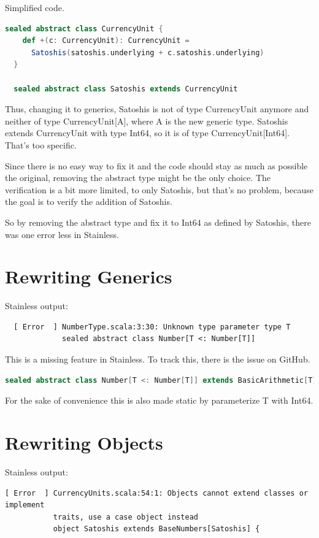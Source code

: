 Simplified code.
\begin{lstlisting}[language=scala]
  sealed abstract class CurrencyUnit {
    def +(c: CurrencyUnit): CurrencyUnit =
      Satoshis(satoshis.underlying + c.satoshis.underlying)
  }

  sealed abstract class Satoshis extends CurrencyUnit
\end{lstlisting}

Thus, changing it to generics, Satoshis is not of type CurrencyUnit anymore and neither of type CurrencyUnit[A], where A is the new generic type.
Satoshis extends CurrencyUnit with type Int64, so it is of type CurrencyUnit[Int64].
That's too specific.

Since there is no easy way to fix it and the code should stay as much as possible the original, removing the abstract type might be the only choice.
The verification is a bit more limited, to only Satoshis, but that's no problem, because the goal is to verify the addition of Satoshis.

So by removing the abstract type and fix it to Int64 as defined by Satoshis, there was one error less in Stainless.


\section{Rewriting Generics}
Stainless output:
\begin{lstlisting}
  [ Error  ] NumberType.scala:3:30: Unknown type parameter type T
             sealed abstract class Number[T <: Number[T]]
\end{lstlisting}

This is a missing feature in Stainless.
To track this, there is the issue  on GitHub.
\begin{lstlisting}[language=scala]
  sealed abstract class Number[T <: Number[T]] extends BasicArithmetic[T]  
\end{lstlisting}
For the sake of convenience this is also made static by parameterize T with Int64.


\section{Rewriting Objects}
Stainless output:
\begin{lstlisting}
[ Error  ] CurrencyUnits.scala:54:1: Objects cannot extend classes or implement
           traits, use a case object instead
           object Satoshis extends BaseNumbers[Satoshis] {
\end{lstlisting}

